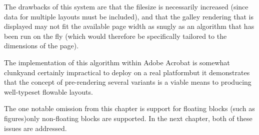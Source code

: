 The drawbacks of this system are that the filesize is necessarily increased (since data for multiple layouts must be included), and that the galley rendering that is displayed may not fit the available page width as snugly as an algorithm that has been run on the fly (which would therefore be specifically tailored to the dimensions of the page).

The implementation of this algorithm within Adobe Acrobat is somewhat clunky\ed and certainly impractical to deploy on a real \ebook{} platform\ed but it demonstrates that the concept of pre-rendering several variants is a viable means to producing well-typeset flowable layouts.

The one notable omission from this chapter is support for floating blocks (such as figures)\ed only non-floating blocks are supported. In the next chapter, both of these issues are addressed.

